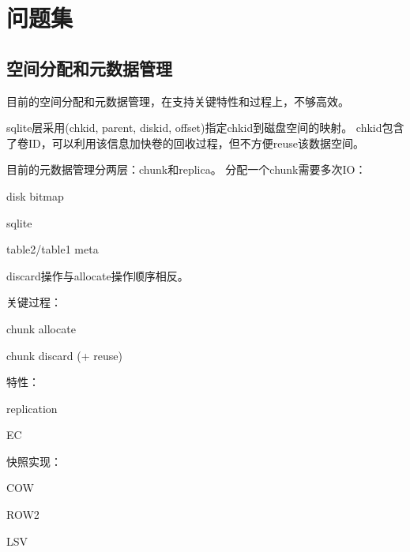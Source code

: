 \chapter{问题集}

\section{空间分配和元数据管理}

目前的空间分配和元数据管理，在支持关键特性和过程上，不够高效。

sqlite层采用(chkid, parent, diskid, offset)指定chkid到磁盘空间的映射。
chkid包含了卷ID，可以利用该信息加快卷的回收过程，但不方便reuse该数据空间。

目前的元数据管理分两层：chunk和replica。
分配一个chunk需要多次IO：
\begin{compactenum}
\item disk bitmap
\item sqlite
\item table2/table1 meta
\end{compactenum}

discard操作与allocate操作顺序相反。

关键过程：
\begin{compactenum}
\item chunk allocate
\item chunk discard (+ reuse)
\end{compactenum}

特性：
\begin{compactenum}
\item replication
\item EC
\end{compactenum}

快照实现：
\begin{compactenum}
\item COW
\item ROW2
\item LSV
\end{compactenum}
